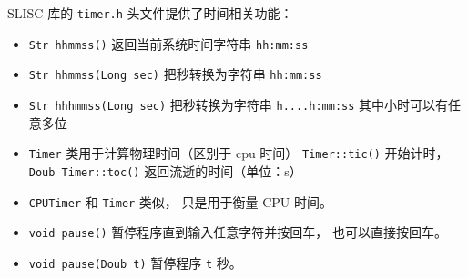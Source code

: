 

SLISC 库的 \verb|timer.h| 头文件提供了时间相关功能：
\begin{itemize}
\item \verb|Str hhmmss()| 返回当前系统时间字符串 \verb|hh:mm:ss|
\item \verb|Str hhmmss(Long sec)| 把秒转换为字符串 \verb|hh:mm:ss|
\item \verb|Str hhhmmss(Long sec)| 把秒转换为字符串 \verb|h....h:mm:ss| 其中小时可以有任意多位
\item \verb|Timer| 类用于计算物理时间（区别于 cpu 时间） \verb|Timer::tic()| 开始计时， \verb|Doub Timer::toc()| 返回流逝的时间（单位：s）
\item \verb|CPUTimer| 和 \verb|Timer| 类似， 只是用于衡量 CPU 时间。
\item \verb|void pause()| 暂停程序直到输入任意字符并按回车， 也可以直接按回车。
\item \verb|void pause(Doub t)| 暂停程序 \verb|t| 秒。
\end{itemize}
